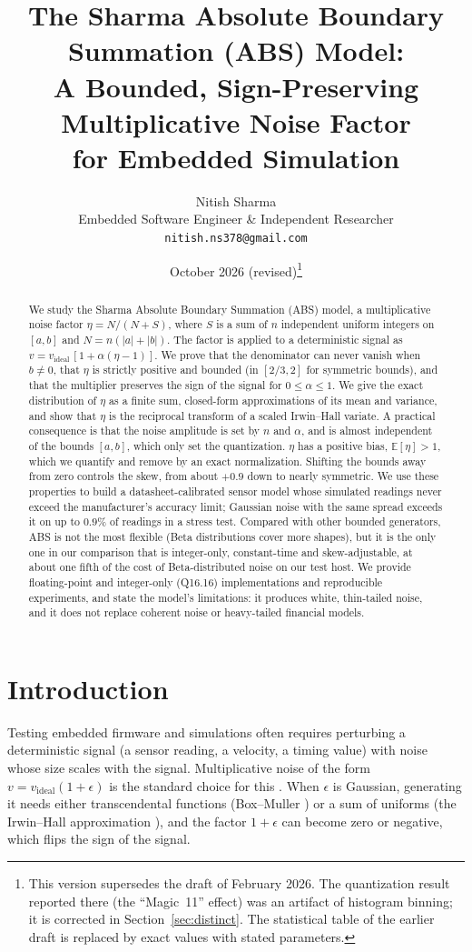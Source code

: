 \documentclass[10pt,a4paper]{article}
\title{The Sharma Absolute Boundary Summation (ABS) Model:\\
A Bounded, Sign-Preserving Multiplicative Noise Factor\\ for Embedded Simulation}
\author{Nitish Sharma\\
\small Embedded Software Engineer \& Independent Researcher\\
\small \texttt{nitish.ns378@gmail.com}}
\date{October 2026 (revised)\thanks{This version supersedes the draft of February 2026.
The quantization result reported there (the ``Magic~11'' effect) was an artifact of
histogram binning; it is corrected in Section~\ref{sec:distinct}. The statistical table of
the earlier draft is replaced by exact values with stated parameters.}}
\theoremstyle{definition}
\theoremstyle{remark}
\newcommand{\E}{\mathbb{E}}
\begin{document}
\maketitle

\begin{abstract}
We study the Sharma Absolute Boundary Summation (ABS) model, a multiplicative noise factor
$\eta = N/(N+S)$, where $S$ is a sum of $n$ independent uniform integers on $[a,b]$ and
$N=n(|a|+|b|)$. The factor is applied to a deterministic signal as
$v = v_{\text{ideal}}\,[1+\alpha(\eta-1)]$. We prove that the denominator can never vanish
when $b\neq 0$, that $\eta$ is strictly positive and bounded (in $[2/3,2]$ for symmetric
bounds), and that the multiplier preserves the sign of the signal for $0\le\alpha\le1$.
We give the exact distribution of $\eta$ as a finite sum, closed-form approximations of
its mean and variance, and show that $\eta$ is the reciprocal transform of a scaled
Irwin--Hall variate. A practical consequence is that the noise amplitude is set by $n$ and
$\alpha$, and is almost independent of the bounds $[a,b]$, which only set the quantization.
$\eta$ has a positive bias, $\E[\eta]>1$, which we quantify and remove by an exact
normalization. Shifting the bounds away from zero controls the skew, from about $+0.9$ down
to nearly symmetric. We use these properties to build a datasheet-calibrated sensor model
whose simulated readings never exceed the manufacturer's accuracy limit; Gaussian noise with
the same spread exceeds it on up to $0.9\%$ of readings in a stress test. Compared with other
bounded generators, ABS is not the most flexible (Beta distributions cover more shapes), but
it is the only one in our comparison that is integer-only, constant-time and skew-adjustable,
at about one fifth of the cost of Beta-distributed noise on our test host. We provide
floating-point and integer-only (Q16.16) implementations and reproducible experiments, and
state the model's limitations: it produces white, thin-tailed noise, and it does not replace
coherent noise or heavy-tailed financial models.
\end{abstract}

\section{Introduction}
Testing embedded firmware and simulations often requires perturbing a deterministic
signal (a sensor reading, a velocity, a timing value) with noise whose size scales with the
signal. Multiplicative noise of the form $v=v_{\text{ideal}}(1+\epsilon)$ is the standard
choice for this \cite{gardiner,kloeden}. When $\epsilon$ is Gaussian, generating it needs
either transcendental functions (Box--Muller \cite{boxmuller}) or a sum of uniforms
(the Irwin--Hall approximation \cite{irwin,hall}), and the factor $1+\epsilon$ can become
zero or negative, which flips the sign of the signal.
\end{document}
